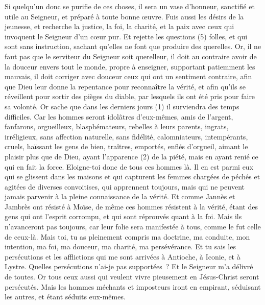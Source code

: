 \begin{multicols}{2}
Si quelqu'un donc se purifie de ces choses, il sera un vase d’honneur, sanctifié et utile au Seigneur, et préparé à toute bonne œuvre.
Fuis aussi les désirs de la jeunesse, et recherche la justice, la foi, la charité, et la paix avec ceux qui invoquent le Seigneur d'un cœur pur.
Et rejette les questions (5) folles, et qui sont sans instruction, sachant qu'elles ne font que produire des querelles.
Or, il ne faut pas que le serviteur du Seigneur soit querelleur, il doit au contraire avoir de la douceur envers tout le monde, propre à enseigner, supportant patiemment les mauvais,
il doit corriger avec douceur ceux qui ont un sentiment contraire, afin que Dieu leur donne la repentance pour reconnaître la vérité,
et afin qu'ils se réveillent pour sortir des pièges du diable, par lesquels ils ont été pris pour faire sa volonté.
\VerseOne{}Or sache que dans les derniers jours (1) il surviendra des temps difficiles.
Car les hommes seront idolâtres d’eux-mêmes, amis de l’argent, fanfarons, orgueilleux, blasphémateurs, rebelles à leurs parents, ingrats, irréligieux,
sans affection naturelle, sans fidélité, calomniateurs, intempérants, cruels, haïssant les gens de bien,
traîtres, emportés, enflés d'orgueil, aimant le plaisir plus que de Dieu,
ayant l'apparence (2) de la piété, mais en ayant renié ce qui en fait la force. Eloigne-toi donc de tous ces hommes là.
Il en est parmi eux qui se glissent dans les maisons et qui capturent les femmes chargées de péchés et agitées de diverses convoitises,
qui apprennent toujours, mais qui ne peuvent jamais parvenir à la pleine connaissance de la vérité.
Et comme Jannès et Jambrès ont résisté à Moïse, de même ces hommes résistent à la vérité, étant des gens qui ont l'esprit corrompu, et qui sont réprouvés quant à la foi.
Mais ils n'avanceront pas toujours, car leur folie sera manifestée à tous, comme le fut celle de ceux-là.
Mais toi, tu as pleinement compris ma doctrine, ma conduite, mon intention, ma foi, ma douceur, ma charité, ma persévérance.
Et tu sais les persécutions et les afflictions qui me sont arrivées à Antioche, à Iconie, et à Lystre. Quelles persécutions n’ai-je pas supportées ? Et le Seigneur m'a délivré de toutes.
Or tous ceux aussi qui veulent vivre pieusement en Jésus-Christ seront persécutés.
Mais les hommes méchants et imposteurs iront en empirant, séduisant les autres, et étant séduits eux-mêmes.

\end{multicols}
